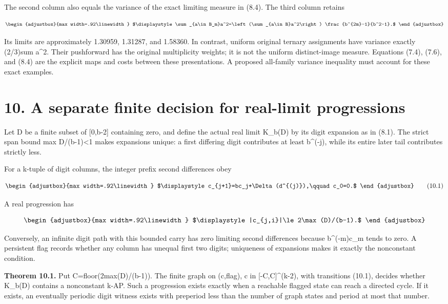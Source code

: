The second column also equals the variance of the exact limiting measure in (8.4). The third column retains

\[
\begin{adjustbox}{max width=.92\linewidth}
$\displaystyle \sum_{a\in B_m}a^2=\left(\sum_{a\in B}a^2\right)
 \frac{b^{2m}-1}{b^2-1}.$
\end{adjustbox}
\]

Its limits are approximately 1.30959, 1.31287, and 1.58360. In contrast, uniform original ternary assignments have variance exactly (2/3)sum a\^{}2. Their pushforward has the original multiplicity weights; it is not the uniform distinct-image measure. Equations (7.4), (7.6), and (8.4) are the explicit maps and costs between these presentations. A proposed all-family variance inequality must account for these exact examples.

\section{10. A separate finite decision for real-limit progressions}\label{n20-a-separate-finite-decision-for-real-limit-progressions}

Let D be a finite subset of {[}0,b-2{]} containing zero, and define the actual real limit K\_b(D) by its digit expansion as in (8.1). The strict span bound max D/(b-1)\textless1 makes expansions unique: a first differing digit contributes at least b\^{}(-j), while its entire later tail contributes strictly less.

For a k-tuple of digit columns, the integer prefix second differences obey

\[
\begin{adjustbox}{max width=.92\linewidth}
$\displaystyle c_{j+1}=bc_j+\Delta(d^{(j)}),\qquad c_0=0.$
\end{adjustbox}
\tag{10.1}
\]

A real progression has

\[
\begin{adjustbox}{max width=.92\linewidth}
$\displaystyle |c_{j,i}|\le 2\max(D)/(b-1).$
\end{adjustbox}
\]

Conversely, an infinite digit path with this bounded carry has zero limiting second differences because b\^{}(-m)c\_m tends to zero. A persistent flag records whether any column has unequal first two digits; uniqueness of expansions makes it exactly the nonconstant condition.

\textbf{Theorem 10.1.} Put C=floor(2max(D)/(b-1)). The finite graph on (c,flag), c in {[}-C,C{]}\^{}(k-2), with transitions (10.1), decides whether K\_b(D) contains a nonconstant k-AP. Such a progression exists exactly when a reachable flagged state can reach a directed cycle. If it exists, an eventually periodic digit witness exists with preperiod less than the number of graph states and period at most that number.

